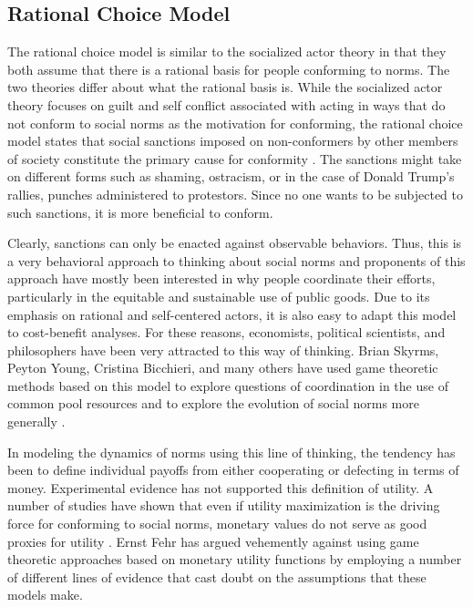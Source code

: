\documentclass[rutwik_proposal.tex]{subfiles}
\begin{document}
\subsection{Rational Choice Model}\label{subsec:rationality}

The rational choice model is similar to the socialized actor theory in that they both assume that there is a rational basis for people conforming to norms. The two theories differ about what the rational basis is. While the socialized actor theory focuses on guilt and self conflict associated with acting in ways that do not conform to social norms as the motivation for conforming, the rational choice model states that social sanctions imposed on non-conformers by other members of society constitute the primary cause for conformity \cite{Axelrod86}. The sanctions might take on different forms such as shaming, ostracism, or in the case of Donald Trump's rallies, punches administered to protestors. Since no one wants to be subjected to such sanctions, it is more beneficial to conform.

Clearly, sanctions can only be enacted against observable behaviors. Thus, this is a very behavioral approach to thinking about social norms and proponents of this approach have mostly been interested in why people coordinate their efforts, particularly in the equitable and sustainable use of public goods. Due to its emphasis on rational and self-centered actors, it is also easy to adapt this model to cost-benefit analyses. For these reasons, economists, political scientists, and philosophers have been very attracted to this way of thinking. Brian Skyrms, Peyton Young, Cristina Bicchieri, and many others have used game theoretic methods based on this model to explore questions of coordination in the use of common pool resources and to explore the evolution of social norms more generally \cite{Skyrms96, Skyrms04, Young1998}. 

In modeling the dynamics of norms using this line of thinking, the tendency has been to define individual payoffs from either cooperating or defecting in terms of money. Experimental evidence has not supported this definition of utility. A number of studies have shown that even if utility maximization is the driving force for conforming to social norms, monetary values do not serve as good proxies for utility \cite{Fehr03}. Ernst Fehr has argued vehemently against using game theoretic approaches based on monetary utility functions by employing a number of different lines of evidence that cast doubt on the assumptions that these models make.
\end{document}
